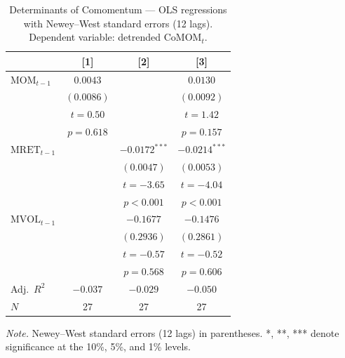 \begin{table}[htbp]
\centering
\caption{Determinants of Comomentum --- OLS regressions with Newey--West standard errors (12 lags). Dependent variable: detrended $\text{CoMOM}_t$.}
\label{tab:determinants}
\small
\begin{tabular}{l c c c}
\toprule
     & [1] & [2] & [3] \\
\midrule
    $\text{MOM}_{t-1}$ & $0.0043$ &  & $0.0130$ \\
     & $(0.0086)$ &  & $(0.0092)$ \\
     & $t = 0.50$ &  & $t = 1.42$ \\
     & $p = 0.618$ &  & $p = 0.157$ \\[4pt]
    $\text{MRET}_{t-1}$ &  & $-0.0172^{***}$ & $-0.0214^{***}$ \\
     &  & $(0.0047)$ & $(0.0053)$ \\
     &  & $t = -3.65$ & $t = -4.04$ \\
     &  & $p < 0.001$ & $p < 0.001$ \\[4pt]
    $\text{MVOL}_{t-1}$ &  & $-0.1677$ & $-0.1476$ \\
     &  & $(0.2936)$ & $(0.2861)$ \\
     &  & $t = -0.57$ & $t = -0.52$ \\
     &  & $p = 0.568$ & $p = 0.606$ \\[4pt]
\midrule
    Adj.\ $R^2$ & $-0.037$ & $-0.029$ & $-0.050$ \\
    $N$ & 27 & 27 & 27 \\
\bottomrule
\end{tabular}
\vspace{4pt}
\begin{flushleft}
\footnotesize
\textit{Note.} Newey--West standard errors (12 lags) in parentheses. *, **, *** denote significance at the 10\%, 5\%, and 1\% levels.
\end{flushleft}
\end{table}
